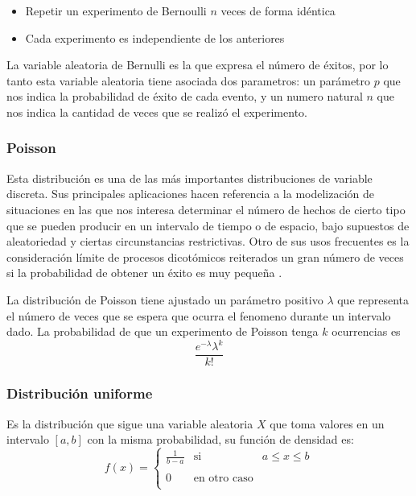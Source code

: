 \documentclass[
  12pt,
]{krantz}
\theoremstyle{definition}
\theoremstyle{definition}
\theoremstyle{definition}
\theoremstyle{remark}
\begin{document}
\begin{itemize}
\item
  Repetir un experimento de Bernoulli \(n\) veces de forma idéntica
\item
  Cada experimento es independiente de los anteriores
\end{itemize}

La variable aleatoria de Bernulli es la que expresa el número de éxitos, por lo tanto esta variable aleatoria tiene asociada dos parametros: un parámetro \(p\) que nos indica la probabilidad de éxito de cada evento, y un numero natural \(n\) que nos indica la cantidad de veces que se realizó el experimento.

\hypertarget{poisson}{%
\subsubsection{Poisson}\label{poisson}}

Esta distribución es una de las más importantes distribuciones de variable discreta. Sus principales aplicaciones hacen referencia a la modelización de situaciones en las que nos interesa determinar el número de hechos de cierto tipo que se pueden producir en un intervalo de tiempo o de espacio, bajo supuestos de aleatoriedad y ciertas circunstancias restrictivas. Otro de sus usos frecuentes es la consideración límite de procesos dicotómicos reiterados un gran número de veces si la probabilidad de obtener un éxito es muy pequeña .

La distribución de Poisson tiene ajustado un parámetro positivo \(\lambda\) que representa el número de veces que se espera que ocurra el fenomeno durante un intervalo dado. La probabilidad de que un experimento de Poisson tenga \(k\) ocurrencias es \[\frac{e^{-\lambda}\lambda^k}{k!}\]

\hypertarget{distribucion-uniforme}{%
\subsubsection{Distribución uniforme}\label{distribucion-uniforme}}

Es la distribución que sigue una variable aleatoria \(X\) que toma valores en un intervalo \([a,b]\) con la misma probabilidad, su función de densidad es: \[f(x)= \left\{ \begin{array}{lcc}
             \frac{1}{b-a} &   \textrm{si}  & a \leq x \leq b \\
             \\ 0 &  \textrm{en otro caso} \\
             \end{array}
   \right.\]
\end{document}
